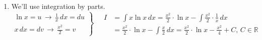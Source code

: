 \documentclass[a4paper, 12pt]{article}
\renewcommand{\headrulewidth}{0pt}
\renewcommand{\headrulewidth}{0pt}
\begin{document}
\begin{enumerate}[leftmargin=*,label=\textbf{\arabic*.}]
\item We'll use integration by parts.
\[
\left.
\begin{array}{ll}
\displaystyle\ln x=u\,\rightarrow\,\frac1x\,dx=du  \\
\displaystyle x\,dx= dv \,\rightarrow\,\frac{x^2}2=v
\end{array}
\right\}\quad
\begin{array}{ll}
I&=\displaystyle\int x\ln x\,dx = \frac{x^2}2\cdot\ln x-\int\frac{x^2}2\cdot \frac1x \,dx \\[1em]&=\displaystyle\frac{x^2}2\cdot\ln x-\int\frac{x}2\,dx=\boxed{\frac{x^2}2\cdot\ln x - \frac{x^2}4+C,\,C\in\mathbb{R}}
\end{array}
\]
\end{enumerate}

\newpage
{}
{}

\newpage
\pagestyle{fancy}
\renewcommand{\headrulewidth}{1pt}

\end{document}
